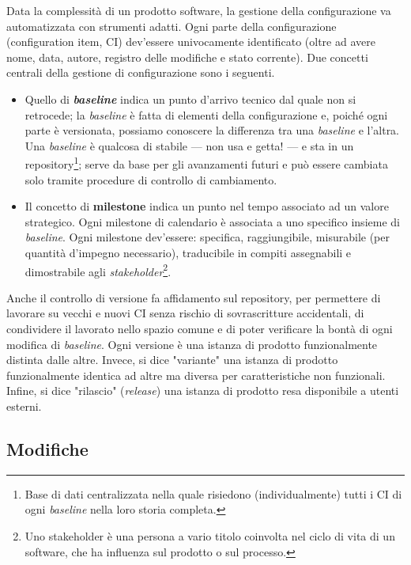 \documentclass[a4paper]{article}
\begin{document}
		
Data la complessità di un prodotto software, la gestione della configurazione va automatizzata con strumenti adatti. Ogni parte della configurazione (configuration item, CI) dev'essere univocamente identificato (oltre ad avere nome, data, autore, registro delle modifiche e stato corrente). Due concetti centrali della gestione di configurazione sono i seguenti.
		
	\begin{itemize}
		
			
	\item Quello di \textbf{\emph{baseline}} indica un punto d'arrivo tecnico dal quale non si retrocede; la \emph{baseline} è fatta di elementi della configurazione e, poiché ogni parte è versionata, possiamo conoscere la differenza tra una \emph{baseline} e l'altra. Una \emph{baseline} è qualcosa di stabile --- non usa e getta! --- e sta in un repository\footnote{Base di dati centralizzata nella quale risiedono (individualmente) tutti i CI di ogni \emph{baseline} nella loro storia completa.}; serve da base per gli avanzamenti futuri e può essere cambiata solo tramite procedure di controllo di cambiamento.
			
	\item Il concetto di \textbf{milestone} indica un punto nel tempo associato ad un valore strategico. Ogni milestone di calendario è associata a uno specifico insieme di \emph{baseline}. Ogni milestone dev'essere: specifica, raggiungibile, misurabile (per quantità d'impegno necessario), traducibile in compiti assegnabili e dimostrabile agli \emph{stakeholder}\footnote{Uno stakeholder è una persona a vario titolo coinvolta nel ciclo di vita di un software, che ha influenza sul prodotto o sul processo.}.
		
	\end{itemize}

		
Anche il controllo di versione fa affidamento sul repository, per permettere di lavorare su vecchi e nuovi CI senza rischio di sovrascritture accidentali, di condividere il lavorato nello spazio comune e di poter verificare la bontà di ogni modifica di \emph{baseline}. Ogni versione è una istanza di prodotto funzionalmente distinta dalle altre. Invece, si dice "variante" una istanza di prodotto funzionalmente identica ad altre ma diversa per caratteristiche non funzionali. Infine, si dice "rilascio" (\emph{release}) una istanza di prodotto resa disponibile a utenti esterni.

		
	\subsection{Modifiche}
\end{document}
